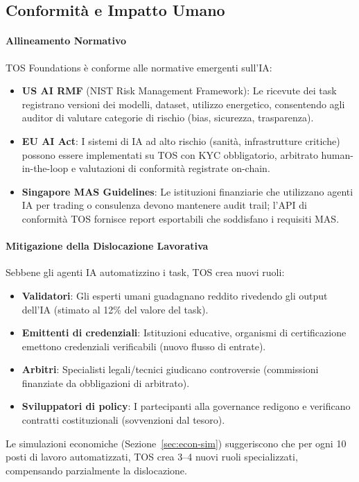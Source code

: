 \documentclass[11pt]{article}
\begin{document}
\subsection{Conformità e Impatto Umano}
\paragraph{Allineamento Normativo} TOS Foundations è conforme alle normative emergenti sull'IA:
\begin{itemize}[noitemsep]
  \item \textbf{US AI RMF} (NIST Risk Management Framework): Le ricevute dei task registrano versioni dei modelli, dataset, utilizzo energetico, consentendo agli auditor di valutare categorie di rischio (bias, sicurezza, trasparenza).
  \item \textbf{EU AI Act}: I sistemi di IA ad alto rischio (sanità, infrastrutture critiche) possono essere implementati su TOS con KYC obbligatorio, arbitrato human-in-the-loop e valutazioni di conformità registrate on-chain.
  \item \textbf{Singapore MAS Guidelines}: Le istituzioni finanziarie che utilizzano agenti IA per trading o consulenza devono mantenere audit trail; l'API di conformità TOS fornisce report esportabili che soddisfano i requisiti MAS.
\end{itemize}

\paragraph{Mitigazione della Dislocazione Lavorativa} Sebbene gli agenti IA automatizzino i task, TOS crea nuovi ruoli:
\begin{itemize}[noitemsep]
  \item \textbf{Validatori}: Gli esperti umani guadagnano reddito rivedendo gli output dell'IA (stimato al 12\% del valore del task).
  \item \textbf{Emittenti di credenziali}: Istituzioni educative, organismi di certificazione emettono credenziali verificabili (nuovo flusso di entrate).
  \item \textbf{Arbitri}: Specialisti legali/tecnici giudicano controversie (commissioni finanziate da obbligazioni di arbitrato).
  \item \textbf{Sviluppatori di policy}: I partecipanti alla governance redigono e verificano contratti costituzionali (sovvenzioni dal tesoro).
\end{itemize}
Le simulazioni economiche (Sezione~\ref{sec:econ-sim}) suggeriscono che per ogni 10 posti di lavoro automatizzati, TOS crea 3--4 nuovi ruoli specializzati, compensando parzialmente la dislocazione.
\end{document}
